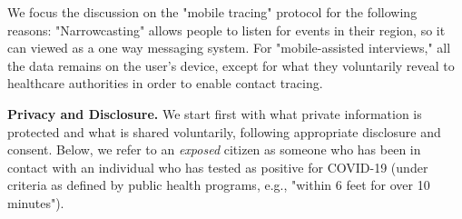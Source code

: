 \documentclass{article}
\begin{document}
We focus the discussion on the "mobile tracing" protocol for the following reasons:  "Narrowcasting" allows people to listen for events in their region, so it can viewed as a one way messaging system. For "mobile-assisted interviews," all the data remains on the user's device, except for what they voluntarily reveal to healthcare authorities in order to enable contact tracing.



\textbf{Privacy and Disclosure.} We start first with what private information is protected and what is shared voluntarily, following appropriate disclosure and consent. Below, we refer to an \emph{exposed} citizen as someone who has been in contact with an individual who has tested as positive for COVID-19 (under criteria as defined by public health programs, e.g., "within 6 feet for over 10 minutes").


\end{document}
